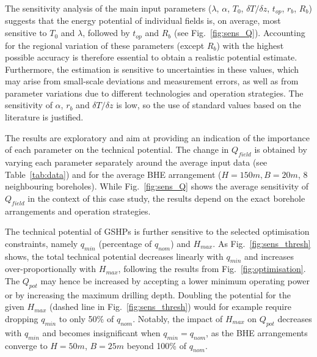 The sensitivity analysis of the main input parameters ($\lambda$, $\alpha$, $T_0$, $\delta T/\delta z$, $t_{op}$, $r_b$, $R_b$) suggests that the energy potential of individual fields is, on average, most sensitive to $T_0$ and $\lambda$, followed by $t_{op}$ and $R_b$ (see Fig.~\ref{fig:sens_Q}). 
Accounting for the regional variation of these parameters (except $R_b$) with the highest possible accuracy is therefore essential to obtain a realistic potential estimate.
Furthermore, the estimation is sensitive to uncertainties in these values, which may arise from small-scale deviations and measurement errors, as well as from parameter variations due to different technologies and operation strategies. 
The sensitivity of $\alpha$, $r_b$ and $\delta T/\delta z$ is low, so the use of standard values based on the literature is justified. 

The results are exploratory and aim at providing an indication of the importance of each parameter on the technical potential. 
The change in $Q_{field}$ is obtained by varying each parameter separately around the average input data (see Table~\ref{tab:data}) and for the average BHE arrangement ($H = 150m, B = 20m$, 8 neighbouring boreholes). 
While Fig.~\ref{fig:sens_Q} shows the average sensitivity of $Q_{field}$ in the context of this case study, the results depend on the exact borehole arrangements and operation strategies.

The technical potential of GSHPs is further sensitive to the selected optimisation constraints, namely $q_{min}$ (percentage of $q_{nom}$) and $H_{max}$.
As Fig.~\ref{fig:sens_thresh} shows, the total technical potential decreases linearly with $q_{min}$ and increases over-proportionally with $H_{max}$, following the results from Fig.~\ref{fig:optimisation}.
The $Q_{pot}$ may hence be increased by accepting a lower minimum operating power or by increasing the maximum drilling depth. 
Doubling the potential for the given $H_{max}$ (dashed line in Fig.~\ref{fig:sens_thresh}) would for example  require dropping $q_{min}$ to only 50\% of $q_{nom}$.
Notably, the impact of $H_{max}$ on $Q_{pot}$ decreases with $q_{min}$ and becomes insignificant when $q_{min} = q_{nom}$, as the BHE arrangements converge to $H = 50m$, $B = 25m$ beyond 100\% of $q_{nom}$.

